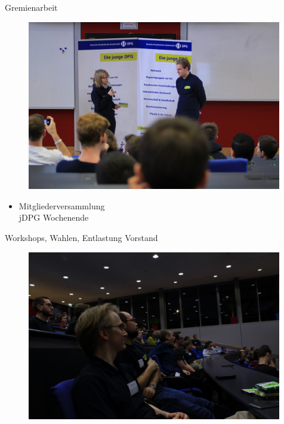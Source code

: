 \documentclass[
]{beamer}
\begin{document}
\begin{frame}{Gremienarbeit}
  \begin{minipage}[0.3\textwidth]
    \begin{figure}
      \centering
      \includegraphics[width=0.99\textwidth]{figure/MV_2018_badHonnef_christina_mathias}
     \end{figure}
  \end{minipage}%
  \begin{minipage}[0.4\textwidth]
    \begin{itemize}
      \item Mitgliederversammlung\\
      jDPG Wochenende
    \end{itemize}
    Workshops, Wahlen, Entlastung Vorstand
  \end{minipage}
  \begin{minipage}[0.3\textwidth]
    \begin{figure}
      \centering
      \includegraphics[width=0.99\textwidth]{figure/MV_2018_badHonnef_publikum}
     \end{figure}
  \end{minipage}


\end{frame}
\end{document}
